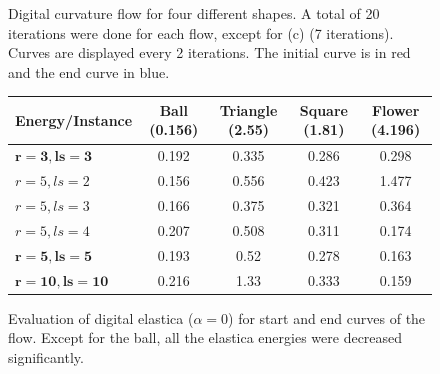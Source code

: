 \documentclass[runningheads]{llncs}
\begin{document}
\begin{figure}[!ht]
{		\hspace{15pt}
		\hspace{15pt}
		}

		\caption{Digital curvature flow for four different shapes. A total of 20 iterations were done for each flow, except for (c) (7 iterations). Curves are displayed every 2 iterations. The initial curve is in red and the end curve in blue.}
		\label{fig:digital_flows}	
	\end{figure}


\begin{figure}[!ht]
\center
\begin{tabular}{l|c|c|c|c}
	Energy/Instance & Ball (0.156) & Triangle (2.55) & Square (1.81) & Flower (4.196) \\
	\hline
	$\mathbf{r=3,ls=3}$ & 0.192 & 0.335 & 0.286 & 0.298\\
	\hline
	$r=5,ls=2$ & 0.156 & 0.556 & 0.423 & 1.477 \\
	$r=5,ls=3$ & 0.166 & 0.375 & 0.321 & 0.364 \\	 
	$r=5,ls=4$ & 0.207 & 0.508 & 0.311 & 0.174\\
	$\mathbf{r=5,ls=5}$ & 0.193 & 0.52 & 0.278 & 0.163\\	
	\hline
	$\mathbf{r=10,ls=10}$ & 0.216 & 1.33 & 0.333 & 0.159		
\end{tabular}
\caption{Evaluation of digital elastica ($\alpha=0$) for start and end curves of the flow. Except for the ball, all the elastica energies were decreased significantly.}
\label{tab:digital_glows_elastica_result}
\end{figure}
\end{document}
